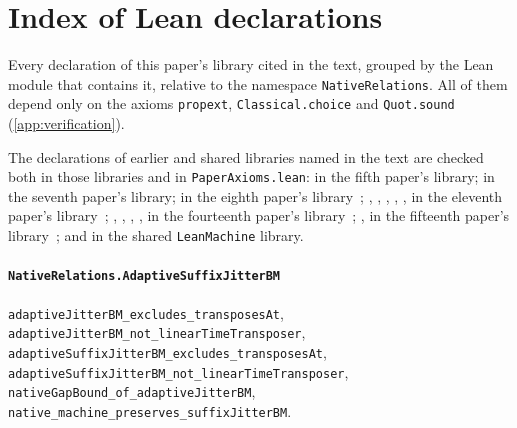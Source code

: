 \section{Index of Lean declarations}\label{app:leanindex}

Every declaration of this paper's library cited in the text, grouped by the Lean module that contains it, relative to the namespace
\texttt{NativeRelations}. All of them depend only on the axioms \texttt{propext}, \texttt{Classical.choice} and
\texttt{Quot.sound} (\cref{app:verification}).
{\raggedright The declarations of earlier and shared libraries named in the text are checked both in those libraries and in \texttt{PaperAxioms.lean}:  in the fifth paper's library;  in the seventh paper's library;  in the eighth paper's library~\cite{EighthPaper2026}; , , , , ,  in the eleventh paper's library~\cite{MergeDepth2026}; , , , ,  in the fourteenth paper's library~\cite{BoundedStack2026}; ,  in the fifteenth paper's library~\cite{HighRate2026}; and  in the shared \texttt{LeanMachine} library.\par}

\paragraph{\texttt{NativeRelations.AdaptiveSuffixJitterBM}}
{\small\raggedright \texttt{adaptiveJitterBM\_excludes\_transposesAt}, \texttt{adaptiveJitterBM\_not\_linearTimeTransposer}, \texttt{adaptiveSuffixJitterBM\_excludes\_transposesAt}, \texttt{adaptiveSuffixJitterBM\_not\_linearTimeTransposer}, \texttt{nativeGapBound\_of\_adaptiveJitterBM}, \texttt{native\_machine\_preserves\_suffixJitterBM}.\par}

